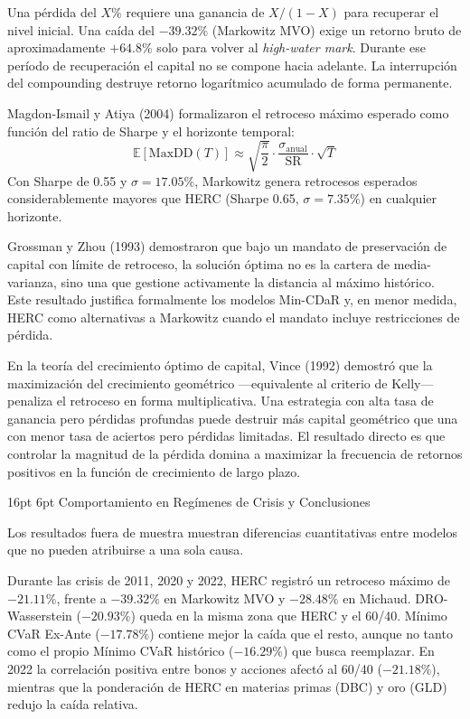 \documentclass[11pt,a4paper]{article}
\makeatletter
\renewcommand\section{\@startsection{section}{1}{\z@}%
  {16pt \@plus 3pt \@minus 2pt}%
  {6pt}%
  {\centering\large\bfseries\color{navyblue}}}
\makeatother
\begin{document}
Una pérdida del $X\%$ requiere una ganancia de $X/(1-X)$ para recuperar el nivel inicial. Una caída del $-39.32\%$ (Markowitz MVO) exige un retorno bruto de aproximadamente $+64.8\%$ solo para volver al \textit{high-water mark}. Durante ese período de recuperación el capital no se compone hacia adelante. La interrupción del compounding destruye retorno logarítmico acumulado de forma permanente.

Magdon-Ismail y Atiya (2004) formalizaron el retroceso máximo esperado como función del ratio de Sharpe y el horizonte temporal:
\begin{equation}
\mathbb{E}[\text{MaxDD}(T)] \approx \sqrt{\frac{\pi}{2}} \cdot \frac{\sigma_{\text{anual}}}{\text{SR}} \cdot \sqrt{T}
\end{equation}
Con Sharpe de 0.55 y $\sigma = 17.05\%$, Markowitz genera retrocesos esperados considerablemente mayores que HERC (Sharpe 0.65, $\sigma = 7.35\%$) en cualquier horizonte.

Grossman y Zhou (1993) demostraron que bajo un mandato de preservación de capital con límite de retroceso, la solución óptima no es la cartera de media-varianza, sino una que gestione activamente la distancia al máximo histórico. Este resultado justifica formalmente los modelos Min-CDaR y, en menor medida, HERC como alternativas a Markowitz cuando el mandato incluye restricciones de pérdida.

En la teoría del crecimiento óptimo de capital, Vince (1992) demostró que la maximización del crecimiento geométrico ---equivalente al criterio de Kelly--- penaliza el retroceso en forma multiplicativa. Una estrategia con alta tasa de ganancia pero pérdidas profundas puede destruir más capital geométrico que una con menor tasa de aciertos pero pérdidas limitadas. El resultado directo es que controlar la magnitud de la pérdida domina a maximizar la frecuencia de retornos positivos en la función de crecimiento de largo plazo.

\section{Comportamiento en Regímenes de Crisis y Conclusiones}

Los resultados fuera de muestra muestran diferencias cuantitativas entre modelos que no pueden atribuirse a una sola causa.

Durante las crisis de 2011, 2020 y 2022, HERC registró un retroceso máximo de $-21.11\%$, frente a $-39.32\%$ en Markowitz MVO y $-28.48\%$ en Michaud. DRO-Wasserstein ($-20.93\%$) queda en la misma zona que HERC y el 60/40. Mínimo CVaR Ex-Ante ($-17.78\%$) contiene mejor la caída que el resto, aunque no tanto como el propio Mínimo CVaR histórico ($-16.29\%$) que busca reemplazar. En 2022 la correlación positiva entre bonos y acciones afectó al 60/40 ($-21.18\%$), mientras que la ponderación de HERC en materias primas (DBC) y oro (GLD) redujo la caída relativa.
\end{document}
